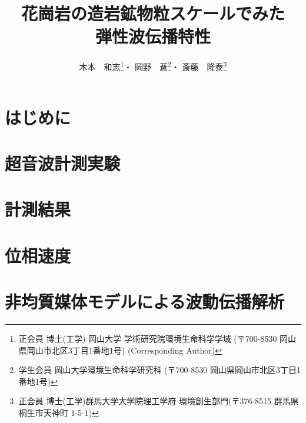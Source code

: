 \documentclass{jsce}
\title{
	花崗岩の造岩鉱物粒スケールでみた\\
	弾性波伝播特性
}%
\author{木本　和志\thanks{正会員 博士(工学) 
岡山大学 学術研究院環境生命科学学域
(〒700-8530 岡山県岡山市北区3丁目1番地1号)\email{kimoto@okayama-u.ac.jp} (Corresponding Author)}・
岡野　蒼\thanks{学生会員 岡山大学環境生命科学研究科 (〒700-8530 岡山県岡山市北区3丁目1番地1号)}・
斎藤　隆泰\thanks{正会員 博士(工学)群馬大学大学院理工学府 環境創生部門(〒376-8515 群馬県桐生市天神町 1-5-1)}
}
\begin{document}
\maketitle
\section{はじめに}
	
\section{超音波計測実験}
%	
\section{計測結果}
%	
\section{位相速度}
%	
\section{非均質媒体モデルによる波動伝播解析}
%	
\end{document}
